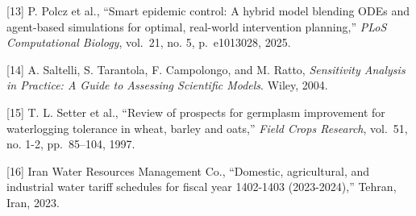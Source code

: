 {[}13{]} P. Polcz et al., ``Smart epidemic control: A hybrid model
blending ODEs and agent-based simulations for optimal, real-world
intervention planning,'' \emph{PLoS Computational Biology}, vol.~21, no.
5, p.~e1013028, 2025.

{[}14{]} A. Saltelli, S. Tarantola, F. Campolongo, and M. Ratto,
\emph{Sensitivity Analysis in Practice: A Guide to Assessing Scientific
Models}. Wiley, 2004.

{[}15{]} T. L. Setter et al., ``Review of prospects for germplasm
improvement for waterlogging tolerance in wheat, barley and oats,''
\emph{Field Crops Research}, vol.~51, no. 1-2, pp.~85--104, 1997.

{[}16{]} Iran Water Resources Management Co., ``Domestic, agricultural,
and industrial water tariff schedules for fiscal year 1402-1403
(2023-2024),'' Tehran, Iran, 2023.
